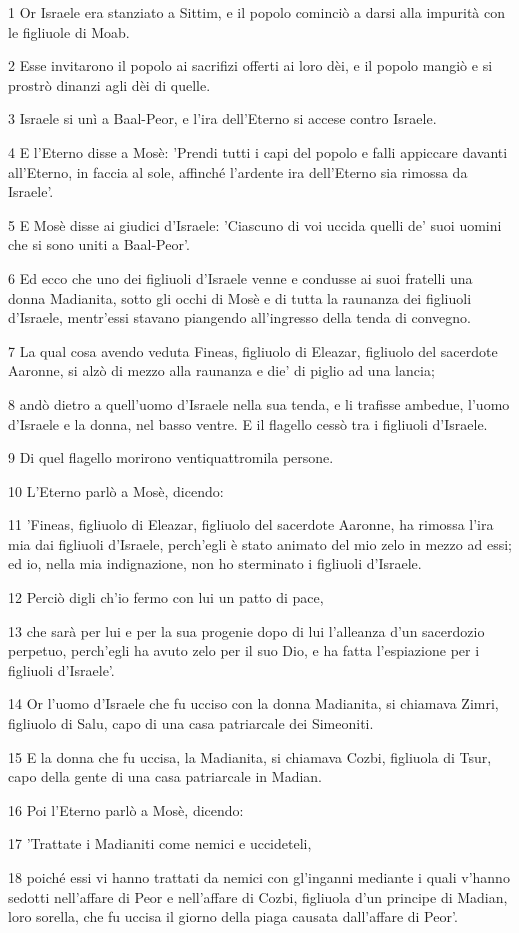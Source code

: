 \par 1 Or Israele era stanziato a Sittim, e il popolo cominciò a darsi alla impurità con le figliuole di Moab.
\par 2 Esse invitarono il popolo ai sacrifizi offerti ai loro dèi, e il popolo mangiò e si prostrò dinanzi agli dèi di quelle.
\par 3 Israele si unì a Baal-Peor, e l'ira dell'Eterno si accese contro Israele.
\par 4 E l'Eterno disse a Mosè: 'Prendi tutti i capi del popolo e falli appiccare davanti all'Eterno, in faccia al sole, affinché l'ardente ira dell'Eterno sia rimossa da Israele'.
\par 5 E Mosè disse ai giudici d'Israele: 'Ciascuno di voi uccida quelli de' suoi uomini che si sono uniti a Baal-Peor'.
\par 6 Ed ecco che uno dei figliuoli d'Israele venne e condusse ai suoi fratelli una donna Madianita, sotto gli occhi di Mosè e di tutta la raunanza dei figliuoli d'Israele, mentr'essi stavano piangendo all'ingresso della tenda di convegno.
\par 7 La qual cosa avendo veduta Fineas, figliuolo di Eleazar, figliuolo del sacerdote Aaronne, si alzò di mezzo alla raunanza e die' di piglio ad una lancia;
\par 8 andò dietro a quell'uomo d'Israele nella sua tenda, e li trafisse ambedue, l'uomo d'Israele e la donna, nel basso ventre. E il flagello cessò tra i figliuoli d'Israele.
\par 9 Di quel flagello morirono ventiquattromila persone.
\par 10 L'Eterno parlò a Mosè, dicendo:
\par 11 'Fineas, figliuolo di Eleazar, figliuolo del sacerdote Aaronne, ha rimossa l'ira mia dai figliuoli d'Israele, perch'egli è stato animato del mio zelo in mezzo ad essi; ed io, nella mia indignazione, non ho sterminato i figliuoli d'Israele.
\par 12 Perciò digli ch'io fermo con lui un patto di pace,
\par 13 che sarà per lui e per la sua progenie dopo di lui l'alleanza d'un sacerdozio perpetuo, perch'egli ha avuto zelo per il suo Dio, e ha fatta l'espiazione per i figliuoli d'Israele'.
\par 14 Or l'uomo d'Israele che fu ucciso con la donna Madianita, si chiamava Zimri, figliuolo di Salu, capo di una casa patriarcale dei Simeoniti.
\par 15 E la donna che fu uccisa, la Madianita, si chiamava Cozbi, figliuola di Tsur, capo della gente di una casa patriarcale in Madian.
\par 16 Poi l'Eterno parlò a Mosè, dicendo:
\par 17 'Trattate i Madianiti come nemici e uccideteli,
\par 18 poiché essi vi hanno trattati da nemici con gl'inganni mediante i quali v'hanno sedotti nell'affare di Peor e nell'affare di Cozbi, figliuola d'un principe di Madian, loro sorella, che fu uccisa il giorno della piaga causata dall'affare di Peor'.

